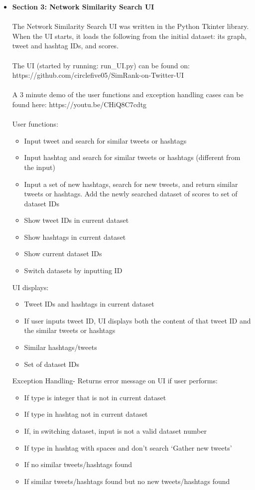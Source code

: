 \documentclass[10pt]{article}
\begin{document}
\begin{itemize}
\item{\bf Section 3: Network Similarity Search UI} 
\\\\
The Network Similarity Search UI was written in the Python Tkinter library. When the UI starts, it loads the following from the initial dataset: its graph, tweet and hashtag IDs, and scores. 
\\\\
The UI (started by running: run\_UI.py) can be found on: \\
https://github.com/circlefive05/SimRank-on-Twitter-UI
\\\\
A 3 minute demo of the user functions and exception handling cases can be found here: https://youtu.be/CHiQ8C7cdtg
\\\\
User functions:
\begin{itemize} 
\item Input tweet and search for similar tweets or hashtags
\item Input hashtag and search for similar tweets or hashtags (different from the input)
\item Input a set of new hashtags, search for new tweets, and return similar tweets or hashtags. Add the newly searched dataset of scores to set of dataset IDs
\item Show tweet IDs in current dataset
\item Show hashtags in current dataset
\item Show current dataset IDs
\item Switch datasets by inputting ID
\end{itemize}

UI displays:
\begin{itemize} 
\item Tweet IDs and hashtags in current dataset
\item If user inputs tweet ID, UI displays both the content of that tweet ID and the similar tweets or hashtags
\item Similar hashtags/tweets
\item Set of dataset IDs
\end{itemize}

Exception Handling- Returns error message on UI if user performs:
\begin{itemize} 
\item If type is integer that is not in current dataset
\item If type in hashtag not in current dataset
\item If, in switching dataset, input is not a valid dataset number
\item If type in hashtag with spaces and don’t search ‘Gather new tweets’
\item If no similar tweets/hashtags found
\item If similar tweets/hashtags found but no new tweets/hashtags found
\end{itemize}

\end{itemize}
\end{document}
